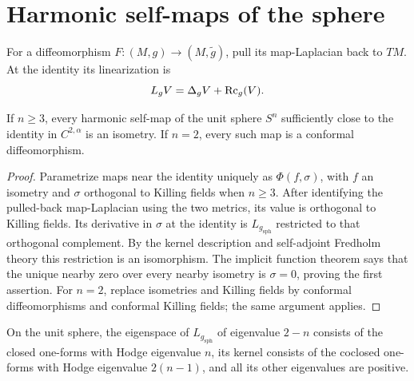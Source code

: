 \section{Harmonic self-maps of the sphere}

For a diffeomorphism \(F:(M,g)\to(M,\widetilde g)\), pull its map-Laplacian
back to \(TM\).  At the identity its linearization is
\[
 L_gV=\Delta_gV+\operatorname{Rc}_g(V).
\]

\begin{proposition}
\label{prop:chow-iv-harmonic-sphere-map-near-identity}


If \(n\ge3\), every harmonic self-map of the unit sphere \(S^n\) sufficiently
close to the identity in \(C^{2,\alpha}\) is an isometry.  If \(n=2\), every
such map is a conformal diffeomorphism.
\end{proposition}
\begin{proof}
\sketch
Parametrize maps near the identity uniquely as \(\Phi(f,\sigma)\), with \(f\)
an isometry and \(\sigma\) orthogonal to Killing fields when \(n\ge3\).  After
identifying the pulled-back map-Laplacian using the two metrics, its value is
orthogonal to Killing fields.  Its derivative in \(\sigma\) at the identity is
\(L_{g_{\mathrm{sph}}}\) restricted to that orthogonal complement.  By the
kernel description and self-adjoint Fredholm theory this restriction is an
isomorphism.  The implicit function theorem says that the unique nearby zero
over every nearby isometry is \(\sigma=0\), proving the first assertion.  For
\(n=2\), replace isometries and Killing fields by conformal diffeomorphisms and
conformal Killing fields; the same argument applies.
\end{proof}

\begin{remark}
\label{rem:chow-iv-sphere-map-laplacian-low-eigenspaces}

On the unit sphere, the eigenspace of \(L_{g_{\mathrm{sph}}}\) of eigenvalue
\(2-n\) consists of the closed one-forms with Hodge eigenvalue \(n\), its
kernel consists of the coclosed one-forms with Hodge eigenvalue \(2(n-1)\),
and all its other eigenvalues are positive.
\end{remark}

